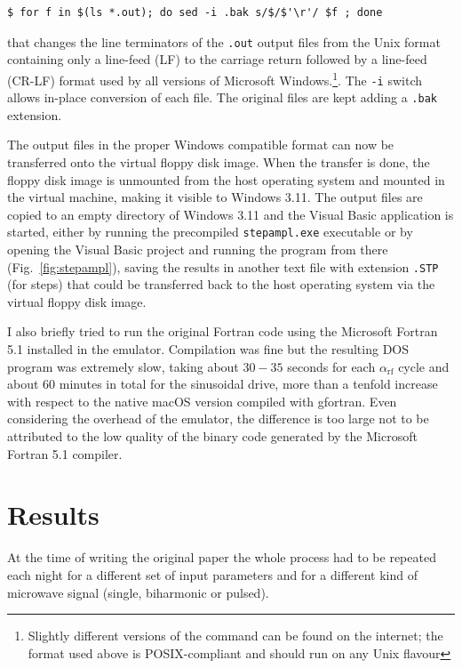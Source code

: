 \begin{verbatim}
$ for f in $(ls *.out); do sed -i .bak s/$/$'\r'/ $f ; done
\end{verbatim}

that changes the line terminators of the \texttt{.out} output files from the Unix format containing only a line-feed (LF) to the carriage return followed by a line-feed (CR-LF) format used by all versions of Microsoft Windows.\footnote{Slightly different versions of the command can be found on the internet; the format used above is POSIX-compliant and should run on any Unix flavour}.
The \texttt{-i} switch allows in-place conversion of each file. The original files are kept adding a \texttt{.bak} extension.

The output files in the proper Windows compatible format can now be transferred onto the virtual floppy disk image. 
When the transfer is done, the floppy disk image is unmounted from the host operating system and mounted  in the virtual machine, making it visible to Windows 3.11. 
The output files are copied to an empty directory of Windows 3.11 and the Visual Basic application is started, either by running the precompiled \texttt{stepampl.exe} executable or by opening the Visual Basic project and running the program from there (Fig.~\ref{fig:stepampl}), saving the results in another text file with extension \texttt{.STP} (for steps) that could be transferred back to the host operating system via the virtual floppy disk image.

I also briefly tried to run the original Fortran code using the Microsoft Fortran 5.1 installed in the emulator. Compilation was fine but the resulting DOS program was extremely slow, taking about $30 - 35$ seconds for each $\alpha_\mathrm{rf}$ cycle and about $60$ minutes in total for the sinusoidal drive, more than a tenfold increase with respect to the native macOS version compiled with gfortran.
Even considering the overhead of the emulator, the difference is too large not to be attributed to the low quality of the binary code generated by the Microsoft Fortran 5.1 compiler.



\section{Results}

At the time of writing the original paper the whole process had to be repeated each night for a different set of input parameters  and for a different kind of microwave signal (single, biharmonic or pulsed).

